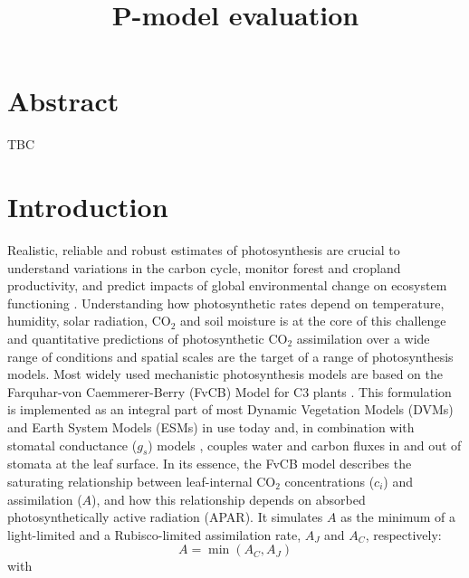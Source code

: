 \documentclass{myreport}
\begin{document}
\pagestyle{headings}

% 

\title{P-model evaluation}

\maketitle

\tableofcontents

\section*{Abstract}

TBC

\section{Introduction}

Realistic, reliable and robust estimates of photosynthesis are crucial to understand variations in the carbon cycle, monitor forest and cropland productivity, and predict impacts of global environmental change on ecosystem functioning \citep{prentice15}. Understanding how photosynthetic rates depend on temperature, humidity, solar radiation, CO$_2$ and soil moisture is at the core of this challenge and quantitative predictions of photosynthetic CO$_2$ assimilation over a wide range of conditions and spatial scales are the target of a range of photosynthesis models. Most widely used mechanistic photosynthesis models are based on the Farquhar-von Caemmerer-Berry (FvCB) Model for C3 plants \citep{farquhar80, voncaemmerer81}. This formulation is implemented as an integral part of most Dynamic Vegetation Models (DVMs) and Earth System Models (ESMs) in use today \cite{smithdukes13gcb} and, in combination with stomatal conductance ($g_s$) models \citep{ball87, leuning95pce, medlyn11gcb}, couples water and carbon fluxes in and out of stomata at the leaf surface. In its essence, the FvCB model describes the saturating relationship between leaf-internal CO$_2$ concentrations ($c_i$) and assimilation ($A$), and how this relationship depends on absorbed photosynthetically active radiation (APAR). It simulates $A$ as the minimum of a light-limited and a Rubisco-limited assimilation rate, $A_J$ and $A_C$, respectively:
\begin{equation}
    A = \min(A_C, A_J)
\end{equation}
with 
\end{document}

